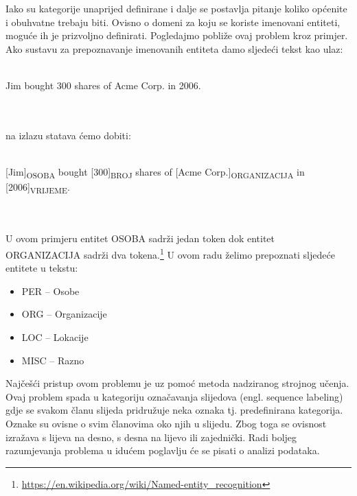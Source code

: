 \documentclass[times, utf8, seminar]{fer}
\begin{document}
Iako su kategorije unaprijed definirane i dalje se postavlja pitanje koliko općenite i obuhvatne trebaju biti. Ovisno o domeni za koju se koriste imenovani entiteti, moguće ih je prizvoljno definirati. Pogledajmo pobliže ovaj problem kroz primjer. Ako sustavu za prepoznavanje imenovanih entiteta damo sljedeći tekst kao ulaz: \\\\
\centerline{Jim  bought 300 shares of Acme Corp. in 2006.}\\\\
na izlazu statava ćemo dobiti:\\\\
\centerline{[Jim]\textsubscript{OSOBA} bought [300]\textsubscript{BROJ} shares of [Acme Corp.]\textsubscript{ORGANIZACIJA} in [2006]\textsubscript{VRIJEME}.}\\\\
U ovom primjeru entitet OSOBA sadrži jedan token dok entitet ORGANIZACIJA sadrži dva tokena.\footnote{\url{https://en.wikipedia.org/wiki/Named-entity_recognition}} U ovom radu želimo prepoznati sljedeće entitete u tekstu:

\begin{itemize}
	\item PER -- Osobe
	\item ORG -- Organizacije
	\item LOC -- Lokacije
	\item MISC -- Razno
\end{itemize}

\newpage 

Najčešći pristup ovom problemu je uz pomoć metoda nadziranog strojnog učenja. Ovaj problem spada u kategoriju označavanja slijedova (engl. sequence labeling) gdje se svakom članu slijeda pridružuje neka oznaka tj. predefinirana kategorija. Oznake su ovisne o svim članovima oko njih u slijedu. Zbog toga se ovisnost izražava s lijeva na desno, s desna na lijevo ili zajednički. Radi boljeg razumjevanja problema u idućem poglavlju će se pisati o analizi podataka.
\end{document}
